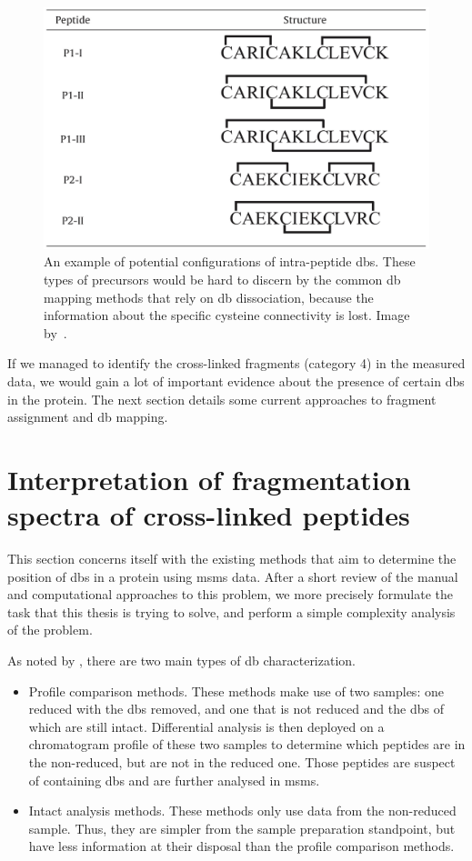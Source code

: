 \begin{figure}
  \centering
  \includegraphics[width=.5\linewidth]{img/intrapeptide-bond.jpeg}
  \caption{An example of potential configurations of intra-peptide \glspl*{db}. These types of precursors would be hard to discern by the common \gls*{db} mapping methods that rely on \gls*{db} dissociation, because the information about the specific cysteine connectivity is lost. Image by~\citet{durand2013tandem}.}\label{fig:intra-peptide-bonds}
\end{figure}

If we managed to identify the cross-linked fragments (category 4) in the measured data, we would gain a lot of important evidence about the presence of certain \glspl*{db} in the protein. The next section details some current approaches to fragment assignment and \gls*{db} mapping.

\section{Interpretation of fragmentation spectra of cross-linked peptides}\label{sec:analysis}

This section concerns itself with the existing methods that aim to determine the position of \glspl*{db} in a protein using \gls*{msms} data. After a short review of the manual and computational approaches to this problem, we more precisely formulate the task that this thesis is trying to solve, and perform a simple complexity analysis of the problem.

As noted by \citet{lakbub2018recent}, there are two main types of \gls*{db} characterization.

\begin{itemize}
  \item Profile comparison methods. These methods make use of two samples: one reduced with the \glspl*{db} removed, and one that is not reduced and the \glspl*{db} of which are still intact. Differential analysis is then deployed on a chromatogram profile of these two samples to determine which peptides are in the non-reduced, but are not in the reduced one. Those peptides are suspect of containing \glspl*{db} and are further analysed in \gls*{msms}\@.
  \item Intact analysis methods. These methods only use data from the non-reduced sample. Thus, they are simpler from the sample preparation standpoint, but have less information at their disposal than the profile comparison methods.
\end{itemize}

